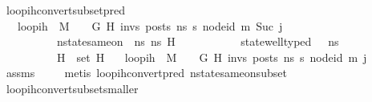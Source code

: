 \begin{isabellebody}
\endisatagproof
{\isafoldproof}%
%
\isadelimproof
\isanewline
%
\endisadelimproof
\isanewline
{}\isamarkupfalse%
\ loop{\isacharunderscore}{\kern0pt}ih{\isacharunderscore}{\kern0pt}convert{\isacharunderscore}{\kern0pt}subset{\isacharunderscore}{\kern0pt}pred{\isacharcolon}{\kern0pt}\isanewline
\ \ \ {\isachardoublequoteopen}loop{\isacharunderscore}{\kern0pt}ih\ \ M\ {\isasymLambda}\ {\isasymGamma}\ {\isasymOmega}\ G\ H\ invs\ posts\ ns{}\ s{\isacharprime}{\kern0pt}\ node{\isacharunderscore}{\kern0pt}id\ m{\isacharprime}{\kern0pt}\ {\isacharparenleft}{\kern0pt}Suc\ j{\isacharparenright}{\kern0pt}{\isachardoublequoteclose}\ \ \isanewline
\ \ \ \ \ \ \ \ \ \ {\isachardoublequoteopen}nstate{\isacharunderscore}{\kern0pt}same{\isacharunderscore}{\kern0pt}on\ {\isasymLambda}\ ns{}\ ns{}{\isacharprime}{\kern0pt}{\isacharprime}{\kern0pt}\ H{\isacharprime}{\kern0pt}{\isachardoublequoteclose}\ \isanewline
\ \ \ \ \ \ \ \ \ \ {\isachardoublequoteopen}state{\isacharunderscore}{\kern0pt}well{\isacharunderscore}{\kern0pt}typed\ {\isasymLambda}\ {\isasymOmega}\ ns{}{\isachardoublequoteclose}\isanewline
\ \ \ \ \ \ \ \ \ \ {\isachardoublequoteopen}H{\isacharprime}{\kern0pt}\ {\isasymsubseteq}\ {\isacharparenleft}{\kern0pt}set\ H{\isacharparenright}{\kern0pt}{\isachardoublequoteclose}\isanewline
\ \ \ {\isachardoublequoteopen}loop{\isacharunderscore}{\kern0pt}ih\ \ M\ {\isasymLambda}\ {\isasymGamma}\ {\isasymOmega}\ G\ H\ invs\ posts\ ns{}{\isacharprime}{\kern0pt}{\isacharprime}{\kern0pt}\ s{\isacharprime}{\kern0pt}\ node{\isacharunderscore}{\kern0pt}id\ m{\isacharprime}{\kern0pt}\ j{\isachardoublequoteclose}\isanewline
%
\isadelimproof
\ \ %
\endisadelimproof
%
\isatagproof
{}\isamarkupfalse%
\ assms\ \isanewline
\ \ \isamarkupfalse%
\ {\isacharparenleft}{\kern0pt}metis\ loop{\isacharunderscore}{\kern0pt}ih{\isacharunderscore}{\kern0pt}convert{\isacharunderscore}{\kern0pt}pred\ nstate{\isacharunderscore}{\kern0pt}same{\isacharunderscore}{\kern0pt}on{\isacharunderscore}{\kern0pt}subset{\isacharunderscore}{\kern0pt}{}{\isacharparenright}{\kern0pt}%
\endisatagproof
{\isafoldproof}%
%
\isadelimproof
\isanewline
%
\endisadelimproof
\isanewline
{}\isamarkupfalse%
\ loop{\isacharunderscore}{\kern0pt}ih{\isacharunderscore}{\kern0pt}convert{\isacharunderscore}{\kern0pt}subset{\isacharunderscore}{\kern0pt}smaller{\isacharunderscore}{\kern0pt}{}{\isacharcolon}{\kern0pt}\isanewline

\end{isabellebody}
